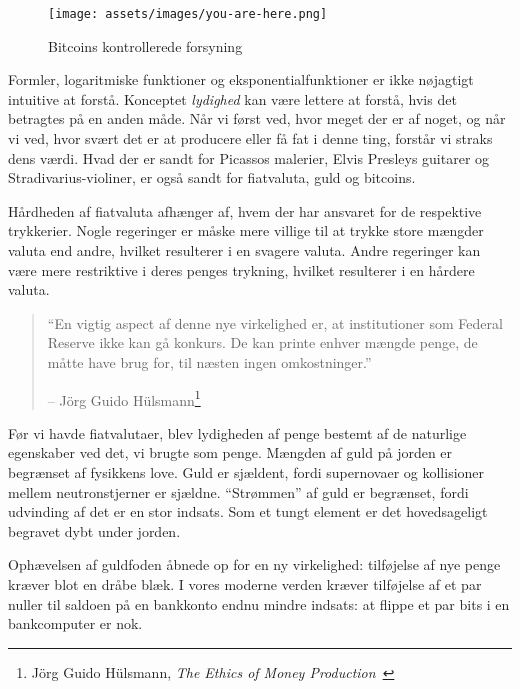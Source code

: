 \begin{figure}[htbp]
  \centering
  \texttt{[image: assets/images/you-are-here.png]}
  \caption{Bitcoins kontrollerede forsyning}
  \label{fig:you-are-here}
\end{figure}

Formler, logaritmiske funktioner og eksponentialfunktioner er ikke nøjagtigt
intuitive at forstå. Konceptet \textit{lydighed} kan være lettere at
forstå, hvis det betragtes på en anden måde. Når vi først ved, hvor meget der er
af noget, og når vi ved, hvor svært det er at producere eller
få fat i denne ting, forstår vi straks dens værdi. Hvad der er sandt for
Picassos malerier, Elvis Presleys guitarer og Stradivarius-violiner,
er også sandt for fiatvaluta, guld og bitcoins.

Hårdheden af fiatvaluta afhænger af, hvem der har ansvaret for
de respektive trykkerier. Nogle regeringer er måske mere villige til at
trykke store mængder valuta end andre, hvilket resulterer i en svagere
valuta. Andre regeringer kan være mere restriktive i deres penges
trykning, hvilket resulterer i en hårdere valuta.

\begin{samepage}\begin{quotation}
\enquote{En vigtig aspect af denne nye virkelighed er, at institutioner som
Federal Reserve ikke kan gå konkurs. De kan printe enhver mængde penge, de
måtte have brug for, til næsten ingen omkostninger.}
\begin{flushright} -- Jörg Guido Hülsmann\footnote{Jörg Guido Hülsmann, 
  \textit{The Ethics of Money Production}~\cite{hulsmann2008ethics}}
\end{flushright}\end{quotation}\end{samepage}

Før vi havde fiatvalutaer, blev lydigheden af penge bestemt af
de naturlige egenskaber ved det, vi brugte som penge. Mængden
af guld på jorden er begrænset af fysikkens love. Guld er sjældent, fordi
supernovaer og kollisioner mellem neutronstjerner er sjældne. 
\enquote{Strømmen} af guld er begrænset, fordi udvinding af det er en stor 
indsats. Som et tungt element er det hovedsageligt begravet dybt under jorden.

Ophævelsen af guldfoden åbnede op for en ny virkelighed: tilføjelse af nye penge
kræver blot en dråbe blæk. I vores moderne verden kræver tilføjelse af et par
nuller til saldoen på en bankkonto endnu mindre indsats: at flippe et par bits 
i en bankcomputer er nok.

